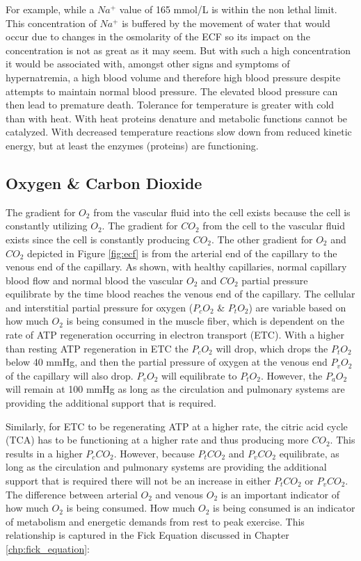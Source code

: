 For example, while a $Na^+$ value of 165 mmol/L is within the non lethal limit. This concentration of $Na^+$ is buffered by the movement of water that would occur due to changes in the osmolarity of the ECF so its impact on the concentration is not as great as it may seem. But with such a high concentration it would be associated with, amongst other signs and symptoms of hypernatremia, a high blood volume and therefore high blood pressure despite attempts to maintain normal blood pressure. The elevated blood pressure can then lead to premature death.  Tolerance for temperature is greater with cold than with heat. With heat proteins denature and metabolic functions cannot be catalyzed. With decreased temperature reactions slow down from reduced kinetic energy, but at least the enzymes (proteins) are functioning. 


\subsection{Oxygen \& Carbon Dioxide}

The gradient for $O_2$ from the vascular fluid into the cell exists because the cell is constantly utilizing $O_2$. The gradient for $CO_2$ from the cell to the vascular fluid exists since the cell is constantly producing $CO_2$. The other gradient for $O_2$ and $CO_2$ depicted in Figure \ref{fig:ecf} is from the arterial end of the capillary to the venous end of the capillary. As shown, with healthy capillaries, normal capillary blood flow and normal blood the vascular $O_2$ and $CO_2$ partial pressure equilibrate by the time blood reaches the venous end of the capillary. The cellular and interstitial partial pressure for oxygen ($P_c O_2$ \& $P_t O_2$) are variable based on how much $O_2$ is being consumed in the muscle fiber, which is dependent on the rate of ATP regeneration occurring in electron transport (ETC). With a higher than resting ATP regeneration in ETC the $P_c O_2$ will drop, which drops the $P_t O_2$ below 40 mmHg, and then the partial pressure of oxygen at the venous end $P_v O_2$ of the capillary will also drop. $P_v O_2$ will equilibrate to $P_t O_2$. However, the $P_a O_2$ will remain at 100 mmHg as long as the circulation and pulmonary systems are providing the additional support that is required.

Similarly, for ETC to be regenerating ATP at a higher rate, the citric acid cycle (TCA) has to be functioning at a higher rate and thus producing more $CO_2$. This results in a higher $P_c CO_2$. However, because $P_t CO_2$ and $P_v CO_2$ equilibrate, as long as the circulation and pulmonary systems are providing the additional support that is required there will not be an increase in either $P_t CO_2$ or $P_v CO_2$. The difference between arterial $O_2$ and venous $O_2$ is an important indicator of how much $O_2$ is being consumed. How much $O_2$ is being consumed is an indicator of metabolism and energetic demands from rest to peak exercise. This relationship is captured in the Fick Equation discussed in Chapter \ref{chp:fick_equation}:


